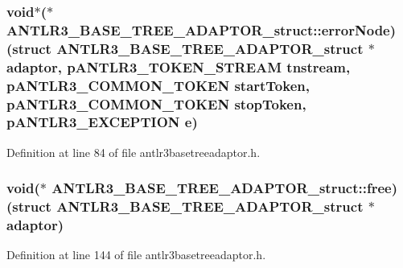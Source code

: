 \hypertarget{struct_a_n_t_l_r3___b_a_s_e___t_r_e_e___a_d_a_p_t_o_r__struct_a1cd062dd808190f6b220a08678e89391}{
\subsubsection[{error\-Node}]{\setlength{\rightskip}{0pt plus 5cm}void$\ast$($\ast$ A\-N\-T\-L\-R3\-\_\-\-B\-A\-S\-E\-\_\-\-T\-R\-E\-E\-\_\-\-A\-D\-A\-P\-T\-O\-R\-\_\-struct\-::error\-Node)(struct {\bf A\-N\-T\-L\-R3\-\_\-\-B\-A\-S\-E\-\_\-\-T\-R\-E\-E\-\_\-\-A\-D\-A\-P\-T\-O\-R\-\_\-struct} $\ast$adaptor, {\bf p\-A\-N\-T\-L\-R3\-\_\-\-T\-O\-K\-E\-N\-\_\-\-S\-T\-R\-E\-A\-M} tnstream, {\bf p\-A\-N\-T\-L\-R3\-\_\-\-C\-O\-M\-M\-O\-N\-\_\-\-T\-O\-K\-E\-N} start\-Token, {\bf p\-A\-N\-T\-L\-R3\-\_\-\-C\-O\-M\-M\-O\-N\-\_\-\-T\-O\-K\-E\-N} stop\-Token, {\bf p\-A\-N\-T\-L\-R3\-\_\-\-E\-X\-C\-E\-P\-T\-I\-O\-N} e)}}\label{struct_a_n_t_l_r3___b_a_s_e___t_r_e_e___a_d_a_p_t_o_r__struct_a1cd062dd808190f6b220a08678e89391}


Definition at line 84 of file antlr3basetreeadaptor.\-h.

\hypertarget{struct_a_n_t_l_r3___b_a_s_e___t_r_e_e___a_d_a_p_t_o_r__struct_ab78f0e016547e49805a68c1620d14073}{
\subsubsection[{free}]{\setlength{\rightskip}{0pt plus 5cm}void($\ast$ A\-N\-T\-L\-R3\-\_\-\-B\-A\-S\-E\-\_\-\-T\-R\-E\-E\-\_\-\-A\-D\-A\-P\-T\-O\-R\-\_\-struct\-::free)(struct {\bf A\-N\-T\-L\-R3\-\_\-\-B\-A\-S\-E\-\_\-\-T\-R\-E\-E\-\_\-\-A\-D\-A\-P\-T\-O\-R\-\_\-struct} $\ast$adaptor)}}\label{struct_a_n_t_l_r3___b_a_s_e___t_r_e_e___a_d_a_p_t_o_r__struct_ab78f0e016547e49805a68c1620d14073}


Definition at line 144 of file antlr3basetreeadaptor.\-h.


